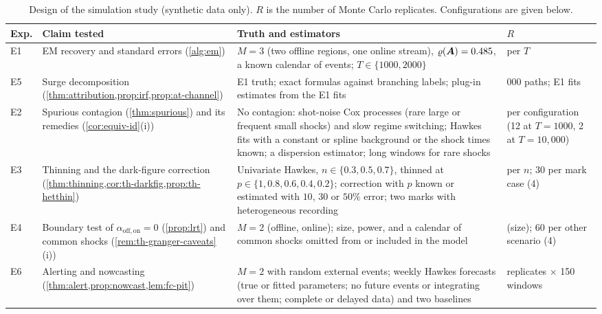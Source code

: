 \begin{table}[t]
\centering
\caption{Design of the simulation study (synthetic data only). $R$ is the number of
Monte Carlo replicates. Configurations are given below.}
\label{tab:sim-design}
\footnotesize
\renewcommand{\arraystretch}{1.1}
\begin{tabularx}{\textwidth}{@{}l>{\raggedright\arraybackslash}p{3.2cm}>{\raggedright\arraybackslash}X>{\raggedright\arraybackslash}p{2.2cm}@{}}
\toprule
Exp. & Claim tested & Truth and estimators & $R$ \\
\midrule
E1 & EM recovery and standard errors (\cref{alg:em}) &
  $M=3$ (two offline regions, one online stream), $\varrho(\bm{A})=0.485$, a known calendar
  of events; $T\in\{1000,2000\}$ & 100 per $T$ \\
E5 & Surge decomposition (\cref{thm:attribution,prop:irf,prop:at-channel}) &
  E1 truth; exact formulas against branching labels; plug-in estimates from the E1 fits &
  20{,}000 paths; E1 fits \\
E2 & Spurious contagion (\cref{thm:spurious}) and its remedies (\cref{cor:equiv-id}(i)) &
  No contagion: shot-noise Cox processes (rare large or frequent small shocks) and slow
  regime switching; Hawkes fits with a constant or spline background or the shock times
  known; a dispersion estimator; long windows for rare shocks & 20 per configuration (12
  at $T=1000$, 2 at $T=10{,}000$) \\
E3 & Thinning and the dark-figure correction (\cref{thm:thinning,cor:th-darkfig,prop:th-hetthin}) &
  Univariate Hawkes, $n\in\{0.3,0.5,0.7\}$, thinned at $p\in\{1,0.8,0.6,0.4,0.2\}$;
  correction with $p$ known or estimated with $10$, $30$ or $50\%$ error; two marks with
  heterogeneous recording & 40 per $n$; 30 per mark case (4) \\
E4 & Boundary test of $\alpha_{\mathrm{off},\mathrm{on}}=0$ (\cref{prop:lrt}) and common
  shocks (\cref{rem:th-granger-caveats}(i)) &
  $M=2$ (offline, online); size, power, and a calendar of common shocks omitted from or
  included in the model & 160 (size); 60 per other scenario (4) \\
E6 & Alerting and nowcasting (\cref{thm:alert,prop:nowcast,lem:fc-pit}) &
  $M=2$ with random external events; weekly Hawkes forecasts (true or fitted parameters;
  no future events or integrating over them; complete or delayed data) and two baselines &
  12 replicates $\times$ 150 windows \\
\bottomrule
\end{tabularx}
\end{table}


